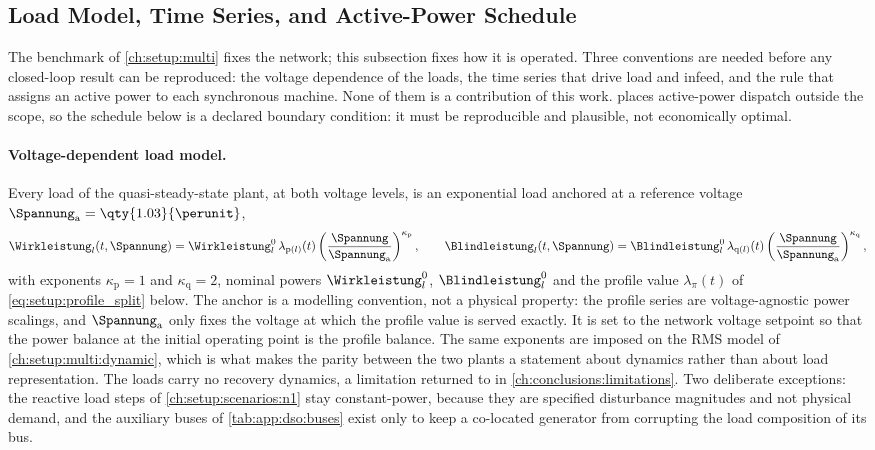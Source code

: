 \subsection{Load Model, Time Series, and Active-Power Schedule} \label{ch:setup:operation}
The benchmark of \cref{ch:setup:multi} fixes the network; this subsection fixes how it is operated.
Three conventions are needed before any closed-loop result can be reproduced: the voltage dependence of the loads, the time series that drive load and infeed, and the rule that assigns an active power to each synchronous machine.
None of them is a contribution of this work.
 places active-power dispatch outside the scope, so the schedule below is a declared boundary condition: it must be reproducible and plausible, not economically optimal.

\paragraph{Voltage-dependent load model.}
Every load of the quasi-steady-state plant, at both voltage levels, is an exponential load anchored at a reference voltage $\Spannung_{\mathrm{a}} = \qty{1.03}{\perunit}$,
\begin{equation}
	\Wirkleistung_{l}(t,\Spannung) = \Wirkleistung_{l}^{0}\,\lambda_{\mathrm{p}(l)}(t)\left(\frac{\Spannung}{\Spannung_{\mathrm{a}}}\right)^{\kappa_{\mathrm{p}}},
	\qquad
	\Blindleistung_{l}(t,\Spannung) = \Blindleistung_{l}^{0}\,\lambda_{\mathrm{q}(l)}(t)\left(\frac{\Spannung}{\Spannung_{\mathrm{a}}}\right)^{\kappa_{\mathrm{q}}},
	\label{eq:setup:zip}
\end{equation}
with exponents $\kappa_{\mathrm{p}} = 1$ and $\kappa_{\mathrm{q}} = 2$, nominal powers $\Wirkleistung_{l}^{0}$, $\Blindleistung_{l}^{0}$ and the profile value $\lambda_{\pi}(t)$ of \cref{eq:setup:profile_split} below.
The anchor is a modelling convention, not a physical property: the profile series are voltage-agnostic power scalings, and $\Spannung_{\mathrm{a}}$ only fixes the voltage at which the profile value is served exactly.
It is set to the network voltage setpoint so that the power balance at the initial operating point is the profile balance.
The same exponents are imposed on the \gls{RMS} model of \cref{ch:setup:multi:dynamic}, which is what makes the parity between the two plants a statement about dynamics rather than about load representation.
The loads carry no recovery dynamics, a limitation returned to in \cref{ch:conclusions:limitations}.
Two deliberate exceptions: the reactive load steps of \cref{ch:setup:scenarios:n1} stay constant-power, because they are specified disturbance magnitudes and not physical demand, and the auxiliary buses of \cref{tab:app:dso:buses} exist only to keep a co-located generator from corrupting the load composition of its bus.

